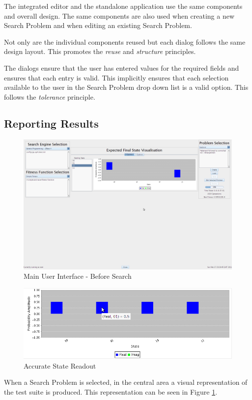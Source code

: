 The integrated editor and the standalone application use the same components and overall design.
The same components are also used when creating a new Search Problem and when editing an existing Search Problem.

Not only are the individual components reused but each dialog follows the same design layout.
This promotes the \emph{reuse} and \emph{structure} principles.

The dialogs ensure that the user has entered values for the required fields and ensures that each entry is valid.
This implicitly ensures that each selection available to the user in the Search Problem drop down list is a valid option.
This follows the \emph{tolerance} principle.

\subsection{Reporting Results}
\label{sec:repres}

\begin{figure}
 \includegraphics[width=\textwidth]{GUIDesignProgress.png}
\caption{Main User Interface - Before Search}
\label{fig:MainGUIDesignProg}
\end{figure}
\begin{figure}
 \includegraphics[width=\textwidth]{AccurateReadOutMouseOver.png}
\caption{Accurate State Readout}
\label{fig:AccStateReadOut}
\end{figure}
When a Search Problem is selected, in the central area a visual representation of the test suite is produced.
This representation can be seen in Figure \ref{fig:MainGUIDesignProg}.


